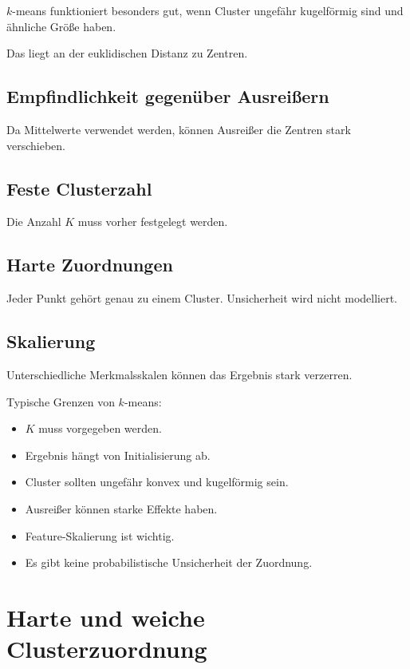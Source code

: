 \(k\)-means funktioniert besonders gut, wenn Cluster ungefähr kugelförmig sind und ähnliche Größe haben.

Das liegt an der euklidischen Distanz zu Zentren.

\subsection{Empfindlichkeit gegenüber Ausreißern}

Da Mittelwerte verwendet werden, können Ausreißer die Zentren stark verschieben.

\subsection{Feste Clusterzahl}

Die Anzahl \(K\) muss vorher festgelegt werden.

\subsection{Harte Zuordnungen}

Jeder Punkt gehört genau zu einem Cluster.
Unsicherheit wird nicht modelliert.

\subsection{Skalierung}

Unterschiedliche Merkmalsskalen können das Ergebnis stark verzerren.

\begin{examtipbox}
Typische Grenzen von \(k\)-means:

\begin{itemize}
    \item \(K\) muss vorgegeben werden.
    \item Ergebnis hängt von Initialisierung ab.
    \item Cluster sollten ungefähr konvex und kugelförmig sein.
    \item Ausreißer können starke Effekte haben.
    \item Feature-Skalierung ist wichtig.
    \item Es gibt keine probabilistische Unsicherheit der Zuordnung.
\end{itemize}
\end{examtipbox}

\section{Harte und weiche Clusterzuordnung}

